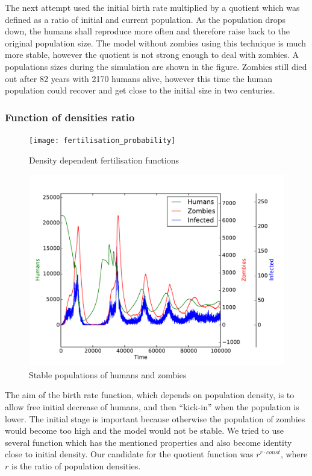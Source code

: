 \documentclass[a4paper]{article}
\begin{document}
The next attempt used the initial birth rate multiplied by a quotient which was defined as a ratio of initial and current population.
As the population drops down, the humans shall reproduce more often and therefore raise back to the original population size.
The model without zombies using this technique is much more stable, however the quotient is not strong enough to deal with zombies.
A populations sizes during the simulation are shown in the figure.
Zombies still died out after 82 years with 2170 humans alive, however this time the human population could recover and get close to the initial size in two centuries.

\subsubsection{Function of densities ratio}

\begin{figure}[pht]
    \centering
    \texttt{[image: fertilisation\_probability]}
    \caption{Density dependent fertilisation functions}
\end{figure}

\begin{figure}[pht]
    \centering
    \includegraphics[width=\textwidth]{stable}
    \caption{Stable populations of humans and zombies}
\end{figure}

The aim of the birth rate function, which depends on population density, is to allow free initial decrease of humans, and then ``kick-in'' when the population is lower.
The initial stage is important because otherwise the population of zombies would become too high and the model would not be stable.
We tried to use several function which has the mentioned properties and also become identity close to initial density.
Our candidate for the quotient function was $r^{r \cdot const}$, where $r$ is the ratio of population densities.
\end{document}
